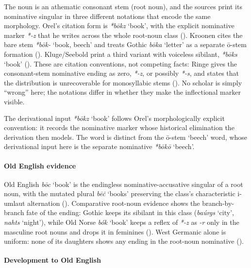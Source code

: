 \documentclass[
  british,
  a4paper,
]{article}
\newcounter{none} %
\providecommand{\Recon}[1]{\emph{*#1}}
\begin{document}
The noun is an athematic consonant stem (root noun), and the sources
print its nominative singular in three different notations that encode
the same morphology. Orel's citation form is \emph{*bōkz} `book', with
the explicit nominative marker \emph{*-z} that he writes across the
whole root-noun class (). Kroonen
cites the bare stem {\emph{*bōk-}} `book, beech' and treats Gothic
\emph{bōka} `letter' as a separate ō-stem formation
(). Kluge/Seebold print
a third variant with voiceless sibilant, {\emph{*bōks}} `book'
(). These are citation
conventions, not competing facts: Ringe gives the consonant-stem
nominative ending as zero, \emph{*-z}, or possibly \emph{*-s}, and
states that the distribution is unrecoverable for monosyllabic stems
(). No scholar is simply
``wrong'' here; the notations differ in whether they make the
inflectional marker visible.

The derivational input \Recon{bōkz} `book' follows Orel's
morphologically explicit convention: it records the nominative marker
whose historical elimination the derivation then models. The word is
distinct from the ō-stem `beech' word, whose derivational input here is
the separate nominative \Recon{bōkō} `beech'.

\paragraph{Old English evidence}\label{old-english-evidence-7}

Old English {\emph{bōc}} `book' is the endingless nominative-accusative
singular of a root noun, with the mutated plural \emph{bēċ} `books'
preserving the class's characteristic i-umlaut alternation
(). Comparative root-noun
evidence shows the branch-by-branch fate of the ending: Gothic keeps its
sibilant in this class (\emph{baúrgs} `city', \emph{nahts} `night'),
while Old Norse \emph{bók} `book' keeps a reflex of \emph{*-z} as
\emph{-r} only in the masculine root nouns and drops it in feminines
(). West Germanic alone is
uniform: none of its daughters shows any ending in the root-noun
nominative ().

\paragraph{Development to Old
English}\label{development-to-old-english-7}
\end{document}
